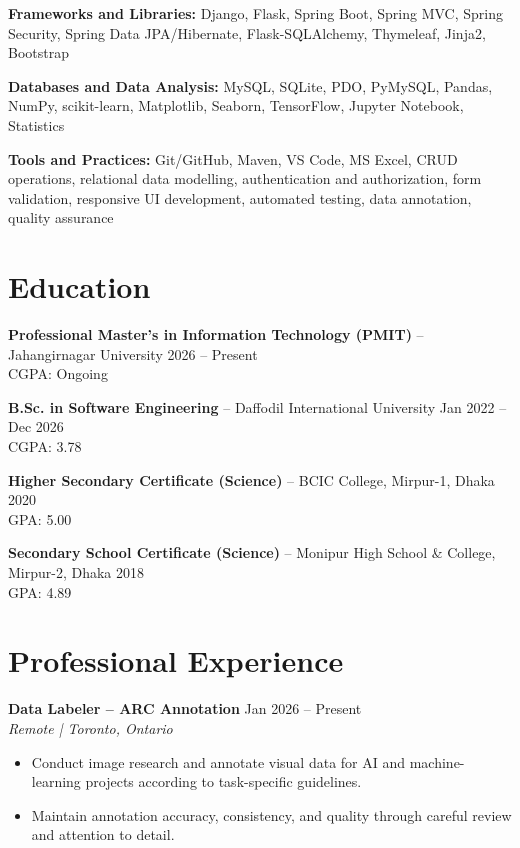 \documentclass[a4paper,10pt]{article}
\begin{document}
\textbf{Frameworks and Libraries:}
Django, Flask, Spring Boot, Spring MVC, Spring Security,
Spring Data JPA/Hibernate, Flask-SQLAlchemy, Thymeleaf,
Jinja2, Bootstrap

\textbf{Databases and Data Analysis:}
MySQL, SQLite, PDO, PyMySQL, Pandas, NumPy, scikit-learn,
Matplotlib, Seaborn, TensorFlow, Jupyter Notebook, Statistics

\textbf{Tools and Practices:}
Git/GitHub, Maven, VS Code, MS Excel, CRUD operations,
relational data modelling, authentication and authorization,
form validation, responsive UI development, automated testing,
data annotation, quality assurance


\section*{Education}

\textbf{Professional Master's in Information Technology (PMIT)}
-- Jahangirnagar University
\hfill 2026 -- Present\\
CGPA: Ongoing

\textbf{B.Sc. in Software Engineering}
-- Daffodil International University
\hfill Jan 2022 -- Dec 2026\\
CGPA: 3.78

\textbf{Higher Secondary Certificate (Science)}
-- BCIC College, Mirpur-1, Dhaka
\hfill 2020\\
GPA: 5.00

\textbf{Secondary School Certificate (Science)}
-- Monipur High School \& College, Mirpur-2, Dhaka
\hfill 2018\\
GPA: 4.89


\section*{Professional Experience}

\textbf{Data Labeler -- ARC Annotation}
\hfill Jan 2026 -- Present\\
{\fontsize{9}{10.5}\selectfont
\textit{Remote | Toronto, Ontario}}

\begin{itemize}
    \item Conduct image research and annotate visual data for AI
    and machine-learning projects according to task-specific guidelines.

    \item Maintain annotation accuracy, consistency, and quality
    through careful review and attention to detail.
\end{itemize}
\end{document}
